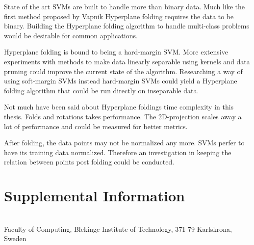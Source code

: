 \documentclass[a4paper,twoside]{bth}
\newcommand{\faculty}{Computing}
\begin{document}
\par State of the art SVMs are built to handle more than binary data. Much like the first method proposed by Vapnik \cite{Cortes:1995:SN:218919.218929, vapnik1} Hyperplane folding requires the data to be binary. Building the Hyperplane folding algorithm to handle multi-class problems would be desirable for common applications.

\par Hyperplane folding is bound to being a hard-margin SVM. More extensive experiments with methods to make data linearly separable using kernels and data pruning could improve the current state of the algorithm. Researching a way of using soft-margin SVMs instead hard-margin SVMs could yield a Hyperplane folding algorithm that could be run directly on inseparable data.

\par Not much have been said about Hyperplane foldings time complexity in this thesis. Folds and rotations takes performance. The 2D-projection scales away a lot of performance and could be measured for better metrics.

\par After folding, the data points may not be normalized any more. SVMs perfer to have its training data normalized. Therefore an investigation in keeping the relation between points post folding could be conducted. 





\appendix
\chapter{Supplemental Information}










\cleardoublepage
\thispagestyle{empty}
\vspace*{\fill}
\clearpage{\thispagestyle{empty}}
\changepage{3cm}{1cm}{-0.5cm}{-0.5cm}{}{-1.5cm}{}{}{}
\vspace*{\fill}
\center

{\bthcsnotextlogo{3cm}}
\\
\noindent\makebox[\linewidth]{\rule{\textwidth}{1pt}} 
Faculty of \faculty, Blekinge Institute of Technology, 371 79 Karlskrona, Sweden
\end{document}
